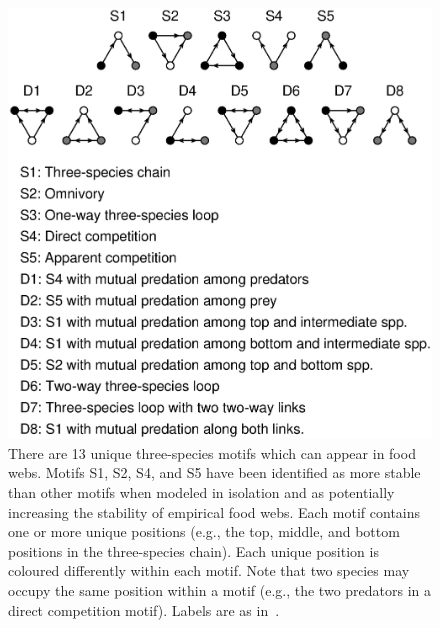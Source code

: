 \documentclass[12pt]{article}
\begin{document}
\begin{spacing}{2.0}
	\begin{figure}[hb!]
		\caption{There are 13 unique three-species motifs which can appear in food webs. Motifs S1, S2, S4, and S5 have been identified as more stable than other motifs when modeled in isolation and as potentially increasing the stability of empirical food webs. Each motif contains one or more unique positions (e.g., the top, middle, and bottom positions in the three-species chain). Each unique position is coloured differently within each motif. Note that two species may occupy the same position within a motif (e.g., the two predators in a direct competition motif). Labels are as in~\citet{Stouffer2007}.}
		\label{motifs}
		\includegraphics[width=.8\textwidth]{figures/motifs.eps}
		\end{figure}

\end{spacing}
\clearpage

     
\end{document}
